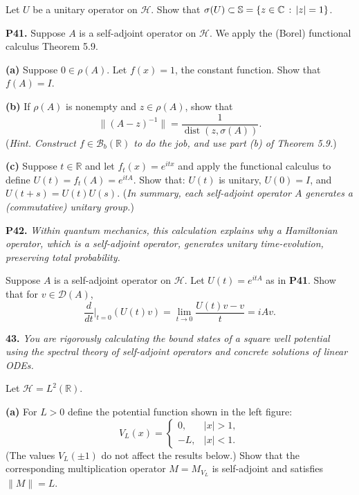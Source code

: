 \documentclass[12pt]{amsart}
\newcommand{\cB}{\mathcal{B}}
\newcommand{\cD}{\mathcal{D}}
\newcommand{\cH}{\mathcal{H}}
\newcommand{\CC}{\mathbb{C}}
\newcommand{\RR}{\mathbb{R}}
\newcommand{\prob}[1]{\bigskip\noindent\textbf{#1.}\quad }
\newcommand{\epart}[1]{\medskip\noindent\textbf{(#1)}\quad }
\begin{document}
\medskip\noindent Let $U$ be a unitary operator on $\cH$.  Show that $\sigma(U) \subset \SS = \{z\in\CC\,:\,|z|=1\}$.


\prob{P41}  Suppose $A$ is a self-adjoint operator on $\cH$.  We apply the (Borel) functional calculus Theorem 5.9.

\epart{a}  Suppose $0\in\rho(A)$.  Let $f(x)=1$, the constant function.  Show that $f(A)=I$.

\epart{b}  If $\rho(A)$ is nonempty and $z\in\rho(A)$, show that
	$$\|(A-z)^{-1}\| = \frac{1}{\operatorname{dist}(z,\sigma(A))}.$$
(\emph{Hint. Construct $f\in\cB_b(\RR)$ to do the job, and use part (b) of Theorem 5.9.})

\epart{c}  Suppose $t\in\RR$ and let $f_t(x) = e^{itx}$ and apply the functional calculus to define $U(t) = f_t(A) = e^{itA}$.  Show that: $U(t)$ is unitary, $U(0) = I$, and $U(t+s) = U(t) U(s)$.  (\emph{In summary, each self-adjoint operator $A$ generates a (commutative) unitary group.})

\prob{P42}  \emph{Within quantum mechanics, this calculation explains why a Hamiltonian operator, which is a self-adjoint operator, generates unitary time-evolution, preserving total probability.}

\medskip\noindent Suppose $A$ is a self-adjoint operator on $\cH$.  Let $U(t) = e^{itA}$ as in \textbf{P41}.  Show that for $v\in\cD(A)$,
	$$\frac{d}{dt}\Big|_{t=0} (U(t)v) = \lim_{t\to 0} \frac{U(t)v-v}{t} = i A v.$$


\prob{43}  \emph{You are rigorously calculating the bound states of a square well potential using the spectral theory of self-adjoint operators and concrete solutions of linear ODEs.}

\medskip\noindent Let $\cH=L^2(\RR)$.

\epart{a}  For $L>0$ define the potential function shown in the left figure:
	$$V_L(x) = \begin{cases} 0, & |x|>1, \\ -L, & |x|<1. \end{cases}$$
(The values $V_L(\pm 1)$ do not affect the results below.)  Show that the corresponding multiplication operator $M = M_{V_L}$ is self-adjoint and satisfies $\|M\|=L$.
\end{document}
